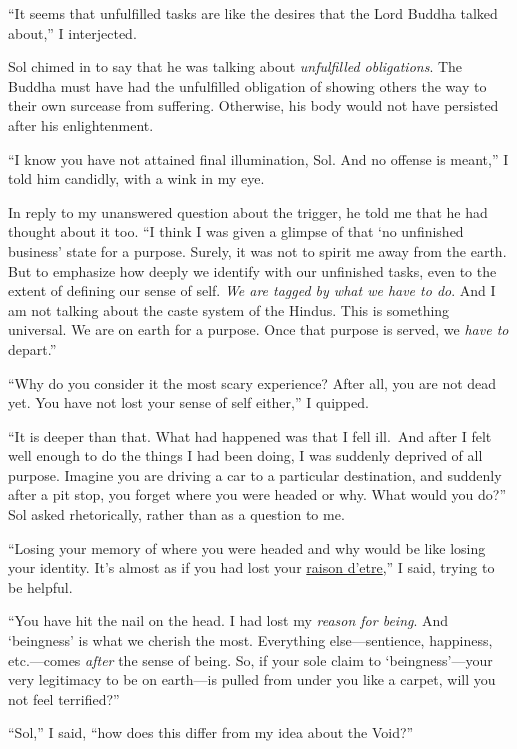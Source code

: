 \documentclass[
  a4paper,
]{article}
\begin{document}
``It seems that unfulfilled tasks are like the desires that the Lord
Buddha talked about,'' I interjected.

Sol chimed in to say that he was talking about \emph{unfulfilled
obligations}. The Buddha must have had the unfulfilled obligation of
showing others the way to their own surcease from suffering. Otherwise,
his body would not have persisted after his enlightenment.

``I know you have not attained final illumination, Sol. And no offense
is meant,'' I told him candidly, with a wink in my eye.

In reply to my unanswered question about the trigger, he told me that he
had thought about it too. ``I think I was given a glimpse of that `no
unfinished business' state for a purpose. Surely, it was not to spirit
me away from the earth. But to emphasize how deeply we identify with our
unfinished tasks, even to the extent of defining our sense of self.
\emph{We are tagged by what we have to do}. And I am not talking about
the caste system of the Hindus. This is something universal. We are on
earth for a purpose. Once that purpose is served, we \emph{have to}
depart.''

``Why do you consider it the most scary experience? After all, you are
not dead yet. You have not lost your sense of self either,'' I quipped.

``It is deeper than that. What had happened was that I fell ill.~And
after I felt well enough to do the things I had been doing, I was
suddenly deprived of all purpose. Imagine you are driving a car to a
particular destination, and suddenly after a pit stop, you forget where
you were headed or why. What would you do?'' Sol asked rhetorically,
rather than as a question to me.

``Losing your memory of where you were headed and why would be like
losing your identity. It's almost as if you had lost your
\href{https://www.vocabulary.com/dictionary/raison\%20d\%27etre}{raison
d'etre},'' I said, trying to be helpful.

``You have hit the nail on the head. I had lost my \emph{reason for
being}. And `beingness' is what we cherish the most. Everything
else---sentience, happiness, etc.---comes \emph{after} the sense of
being. So, if your sole claim to `beingness'---your very legitimacy to
be on earth---is pulled from under you like a carpet, will you not feel
terrified?''

``Sol,'' I said, ``how does this differ from my idea about the Void?''
\end{document}

